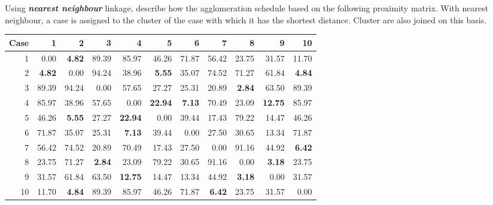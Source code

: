 \documentclass[a4paper,12pt]{article}
\begin{document}
Using \textbf{\textit{nearest neighbour}} linkage, describe how the agglomeration schedule based on the following 
proximity matrix. With nearest neighbour, a case is assigned to the cluster of the case with which it has the shortest distance. Cluster are also joined on this basis.


\begin{table}[ht]
	\centering
	\begin{tabular}{|r|rrrrrrrrrr|}
		\hline
		Case & 1 & 2 & 3 & 4 & 5 & 6 & 7 & 8 & 9 & 10 \\
		\hline
		1 & 0.00 & \textbf{4.82} & 89.39 & 85.97 & 46.26 & 71.87 & 56.42 & 23.75 & 31.57 & 11.70 \\
		2 & \textbf{4.82} & 0.00 & 94.24 & 38.96 & \textbf{5.55} & 35.07 & 74.52 & 71.27 & 61.84 & \textbf{4.84} \\
		3 & 89.39 & 94.24 & 0.00 & 57.65 & 27.27 & 25.31 & 20.89 & \textbf{2.84} & 63.50 & 89.39 \\
		4 & 85.97 & 38.96 & 57.65 & 0.00 & \textbf{22.94} & \textbf{7.13} & 70.49 & 23.09 & \textbf{12.75} & 85.97 \\
		5 & 46.26 & \textbf{5.55} & 27.27 & \textbf{22.94} & 0.00 & 39.44 & 17.43 & 79.22 & 14.47 & 46.26 \\
		6 & 71.87 & 35.07 & 25.31 & \textbf{7.13} & 39.44 & 0.00 & 27.50 & 30.65 & 13.34 & 71.87 \\
		7 & 56.42 & 74.52 & 20.89 & 70.49 & 17.43 & 27.50 & 0.00 & 91.16 & 44.92 & \textbf{6.42} \\
		8 & 23.75 & 71.27 & \textbf{2.84} & 23.09 & 79.22 & 30.65 & 91.16 & 0.00 & \textbf{3.18} & 23.75 \\
		9 & 31.57 & 61.84 & 63.50 & \textbf{12.75} & 14.47 & 13.34 & 44.92 & \textbf{3.18} & 0.00 & 31.57 \\
		10 & 11.70 & \textbf{4.84} & 89.39 & 85.97 & 46.26 & 71.87 & \textbf{6.42} & 23.75 & 31.57 & 0.00 \\
		\hline
	\end{tabular}
\end{table}
\end{document}
